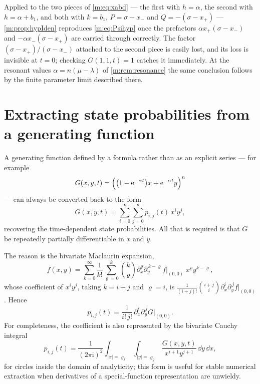 \begin{remark}
Applied to the two pieces of \cref{m:eq:xabd} --- the first with $h=\alpha$, the
second with $h = \alpha+b_1$, and both with $k=b_1$, $P = \sigma-x_-$ and
$Q = -(\sigma-x_+)$ --- \cref{m:prop:hypIden} reproduces \cref{m:eq:Psihyp} once
the prefactors $\alpha x_+(\sigma-x_-)$ and $-\alpha x_-(\sigma-x_+)$ are carried
through correctly. The factor $(\sigma-x_+)/(\sigma-x_-)$ attached to the second
piece is easily lost, and its loss is invisible at $t=0$; checking $G(1,1,t)=1$
catches it immediately. At the resonant values $\alpha = n(\mu-\lambda)$ of
\cref{m:rem:resonance} the same conclusion follows by the finite parameter limit
described there.
\end{remark}

\section{Extracting state probabilities from a generating function}
\label{m:app:extract}

A generating function defined by a formula rather than as an explicit series --- for
example
\begin{equation}
\label{m:eq:examplePgf}
G(x,y,t) = \Bigl(\bigl(1-\mathrm{e}^{-\alpha t}\bigr)x + \mathrm{e}^{-\alpha t}y\Bigr)^n
\end{equation}
--- can always be converted back to the form
\begin{equation}
\label{m:eq:series1}
G(x,y,t) = \sum_{i=0}^{\infty}\sum_{j=0}^{\infty}p_{i,j}(t)\,x^iy^j ,
\end{equation}
recovering the time-dependent state probabilities. All that is required is that $G$
be repeatedly partially differentiable in $x$ and $y$.

The reason is the bivariate Maclaurin expansion,
\begin{equation*}
f(x,y) = \sum_{k=0}^{\infty}\frac{1}{k!}\sum_{\varrho=0}^{k}\binom{k}{\varrho}
\partial_x^{\varrho}\partial_y^{\,k-\varrho}f\Big|_{(0,0)}\;x^{\varrho}y^{k-\varrho},
\end{equation*}
whose coefficient of $x^iy^j$, taking $k=i+j$ and $\varrho=i$, is
$\frac{1}{(i+j)!}\binom{i+j}{i}\partial_x^i\partial_y^{\,j}f\big|_{(0,0)}$. Hence
\begin{equation}
\label{m:eq:stateProb}
p_{i,j}(t) = \frac{1}{i!\,j!}\,\partial_x^i\partial_y^{\,j}G\Big|_{(0,0)} .
\end{equation}
For completeness, the coefficient is also represented by the bivariate Cauchy
integral
\begin{equation}
\label{m:eq:cauchy2d}
p_{i,j}(t) = \frac{1}{(2\pi\mathrm i)^2}
\int_{|x|=\varrho_x}\int_{|y|=\varrho_y}
\frac{G(x,y,t)}{x^{i+1}y^{j+1}}\,\dd y\,\dd x ,
\end{equation}
for circles inside the domain of analyticity; this form is useful for stable
numerical extraction when derivatives of a special-function representation are
unwieldy.

